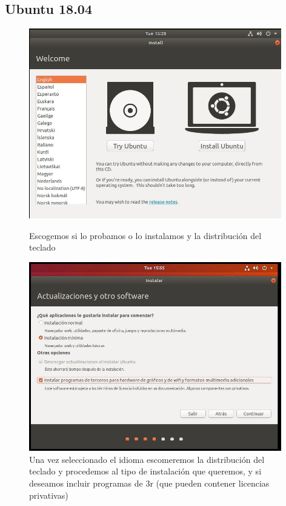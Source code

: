 \documentclass[preprint,11pt]{elsarticle}
\begin{document}
\subsection{Ubuntu 18.04}
\begin{figure}[!htbp]
    \begin{center}
        \includegraphics[width=11cm]{ubuntu1.JPG}
    \end{center}
    \caption{Escogemos si lo probamos o lo instalamos y la distribución del teclado}
    \begin{center}
        \includegraphics[width=11cm]{ubuntu2.JPG}
    \end{center}
    \caption{Una vez seleccionado el idioma escomeremos la distribución del teclado y procedemos al tipo de instalación que queremos, y si deseamos incluir programas de 3r (que pueden contener licencias privativas)}
\end{figure}
\end{document}
